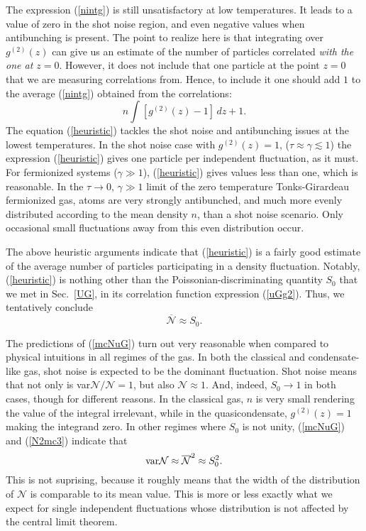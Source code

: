 \documentclass[aps,twocolumn,pra,superscriptaddress,nofootinbib,amsmath,amssymb,floats,floatfix,english]{revtex4-1}
\newcommand{\mc}[1]{{\mathcal{#1}}}
\newcommand{\wb}[1]{{\overline{#1}}}
\newcommand{\eqn}[1]{(\ref{#1})}
\renewcommand{\eq}[2]{\begin{equation}\label{#1}#2\end{equation}}
\begin{document}
The expression \eqn{nintg} is still unsatisfactory at low temperatures. 
It leads to a value of zero in the shot noise region, and even negative values when antibunching is present.
The point to realize here is that integrating over $g^{(2)}(z)$ can give us an estimate of the number of particles correlated \emph{with the one at $z=0$}.
However,  it does not include that one particle at the point $z=0$ that we are measuring correlations from.
Hence, to include it one should add $1$ to the average \eqn{nintg} obtained from the correlations:
\eq{heuristic}{
n\int \left[g^{(2)}(z)-1\right]\,dz + 1.
}
The equation  \eqn{heuristic} tackles the shot noise and antibunching issues at the lowest temperatures.
In the shot noise case with $g^{(2)}(z)=1$, ($\tau\approx\gamma\lesssim1$) the expression \eqn{heuristic} gives one particle per independent fluctuation, as it must. For fermionized systems ($\gamma\gg1$), \eqn{heuristic} gives values less than one, which is reasonable.
In the $\tau\to0$, $\gamma\gg1$ limit of the zero temperature Tonks-Girardeau fermionized gas, atoms are very strongly antibunched, and much more evenly distributed according to the mean density $n$, than a shot noise scenario. Only occasional small fluctuations away from this even distribution occur. 

The above heuristic arguments indicate that \eqn{heuristic} is a fairly good estimate of the average number of particles participating in a density fluctuation.
Notably, \eqn{heuristic} is nothing other than the Poissonian-discriminating quantity $S_0$ that we met in Sec.~\ref{UG}, in its correlation function expression \eqn{uGg2}.
Thus, we tentatively conclude
\eq{mcNuG}{
\wb{\mc{N}} \approx S_0.
}

The predictions of \eqn{mcNuG} turn out very reasonable when compared to physical intuitions in all regimes of the gas. 
In both the classical and condensate-like gas, shot noise is expected to be the dominant fluctuation.
 Shot noise means that not only 
is var$\mc{N}/\mc{N}=1$, but also $\mc{N}\approx 1$. 
 And, indeed, $S_0\to1$ in both cases, though for different reasons. In the classical gas, $n$ is very small rendering the value of the integral irrelevant, while in the quasicondensate,  $g^{(2)}(z)=1$ making the integrand zero.
In other regimes where $S_0$ is not unity, \eqn{mcNuG} and \eqn{N2mc3} indicate that 
\eq{varmcN2}{
{\rm var}\mc{N} \approx \wb{\mc{N}}^2 \approx S_0^2.
}
This is not suprising, because it roughly means that the width of the distribution of $\mc{N}$ is comparable to its mean value. 
This is more or less exactly what we expect for single independent fluctuations whose distribution is not affected by the central limit theorem.
\end{document}

